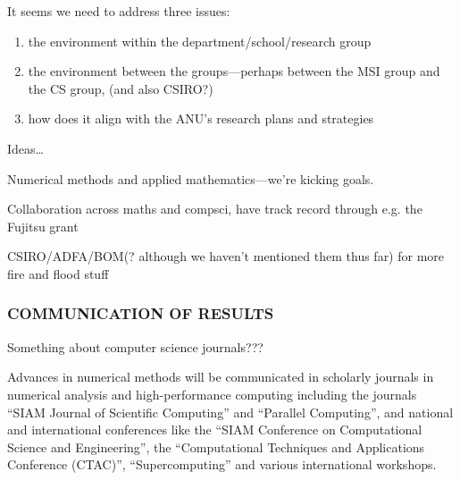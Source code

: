 \documentclass[a4paper,fontsize=12pt]{scrartcl}
\begin{document}

It seems we need to address three issues: 

\begin{enumerate}
\item the environment within the department/school/research group
\item the environment between the groups---perhaps between the MSI
  group and the CS group, (and also CSIRO?)
\item how does it align with the ANU's research plans and strategies
\end{enumerate}

Ideas\ldots

Numerical methods and applied mathematics---we're kicking goals.

Collaboration across maths and compsci, have track record through e.g.
the Fujitsu grant

CSIRO/ADFA/BOM(? although we haven't mentioned them thus far) for more
fire and flood stuff

\subsubsection*{COMMUNICATION OF RESULTS}


Something about computer science journals???

Advances in numerical methods will be communicated in scholarly journals in numerical analysis and high-performance computing including the journals “SIAM Journal of Scientific Computing” and “Parallel Computing”, and national and international conferences like the “SIAM Conference on Computational Science and Engineering”, the “Computational Techniques and Applications Conference (CTAC)”, “Supercomputing” and various international workshops. 
\end{document}
